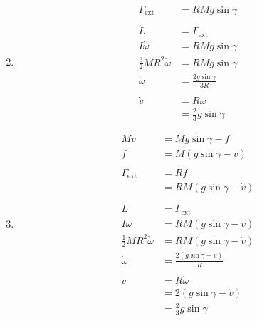 \documentclass{article}
\begin{document}
\begin{enumerate}
  \setcounter{enumi}{1}
  \item

        \begin{align*}
          \Gamma_\text{ext}              & = R M g \sin \gamma           \\ \\
          \dot{L}                        & = \Gamma_\text{ext}           \\
          I \dot{\omega}                 & = R M g \sin \gamma           \\
          \frac{3}{2} M R^2 \dot{\omega} & = R M g \sin \gamma           \\
          \dot{\omega}                   & = \frac{2 g \sin \gamma}{3 R} \\ \\
          \dot{v}                        & = R \dot{\omega}              \\
                                         & = \frac{2}{3} g \sin \gamma
        \end{align*}

  \item

        \begin{align*}
          M \dot{v}                      & = M g \sin \gamma - f                   \\
          f                              & = M (g \sin \gamma - \dot{v})           \\ \\
          \Gamma_\text{ext}              & = R f                                   \\
                                         & = R M (g \sin \gamma - \dot{v})         \\ \\
          \dot{L}                        & = \Gamma_\text{ext}                     \\
          I \dot{\omega}                 & = R M (g \sin \gamma - \dot{v})         \\
          \frac{1}{2} M R^2 \dot{\omega} & = R M (g \sin \gamma - \dot{v})         \\
          \dot{\omega}                   & = \frac{2 (g \sin \gamma - \dot{v})}{R} \\ \\
          \dot{v}                        & = R \dot{\omega}                        \\
                                         & = 2 (g \sin \gamma - \dot{v})           \\
                                         & = \frac{2}{3} g \sin \gamma
        \end{align*}
\end{enumerate}
\end{document}
